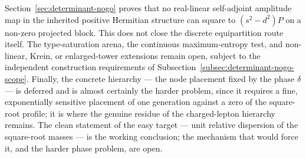 \documentclass[11pt]{article}
\theoremstyle{definition}
\theoremstyle{remark}
\begin{document}
    Section~\ref{sec:determinant-nogo} proves that no real-linear self-adjoint amplitude map in the inherited
    positive Hermitian structure can square to $(s^2-d^2)P$ on a non-zero projected block.
    This does not close the discrete equipartition route itself.
    The type-saturation arena, the continuous maximum-entropy test, and non-linear, Krein, or enlarged-tower
    extensions remain open, subject to the independent construction requirements of
    Subsection~\ref{subsec:determinant-nogo-scope}.
    Finally, the concrete hierarchy --- the node placement fixed by the phase $\delta$ --- is deferred and is
    almost certainly the harder problem, since it requires a fine, exponentially sensitive placement of one
    generation against a zero of the square-root profile; it is where the genuine residue of the charged-lepton
    hierarchy remains.
    The clean statement of the easy target --- unit relative dispersion of the square-root masses --- is the
    working conclusion; the mechanism that would force it, and the harder phase problem, are open.

  \newpage

  
  
\end{document}
